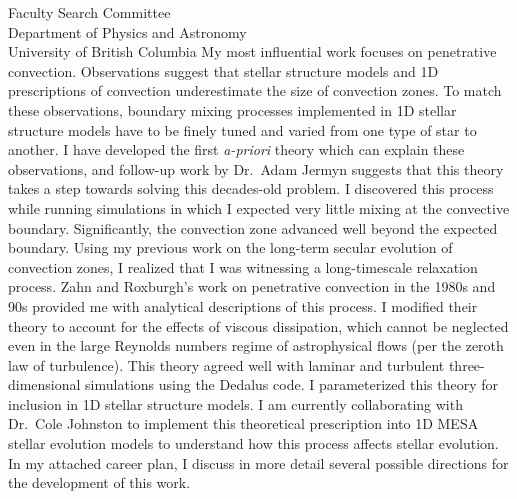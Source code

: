 \documentclass[12pt]{letter}
\begin{document}
\begin{letter}{
               Faculty Search Committee \\
               Department of Physics and Astronomy \\
               University of British Columbia
           }
    My most influential work focuses on penetrative convection.
    Observations suggest that stellar structure models and 1D prescriptions of convection underestimate the size of convection zones.
    To match these observations, boundary mixing processes implemented in 1D stellar structure models have to be finely tuned and varied from one type of star to another.
    I have developed the first \emph{a-priori} theory which can explain these observations, and follow-up work by Dr.~Adam Jermyn suggests that this theory takes a step towards solving this decades-old problem.
    I discovered this process while running simulations in which I expected very little mixing at the convective boundary.
    Significantly, the convection zone advanced well beyond the expected boundary.
    Using my previous work on the long-term secular evolution of convection zones, I realized that I was witnessing a long-timescale relaxation process.
    Zahn and Roxburgh's work on penetrative convection in the 1980s and 90s provided me with analytical descriptions of this process.
    I modified their theory to account for the effects of viscous dissipation, which cannot be neglected even in the large Reynolds numbers regime of astrophysical flows (per the zeroth law of turbulence).
    This theory agreed well with laminar and turbulent three-dimensional simulations using the Dedalus code.
    I parameterized this theory for inclusion in 1D stellar structure models.
    I am currently collaborating with Dr.~Cole Johnston to implement this theoretical prescription into 1D MESA stellar evolution models to understand how this process affects stellar evolution.
    In my attached career plan, I discuss in more detail several possible directions for the development of this work.


\end{letter}
\end{document}
